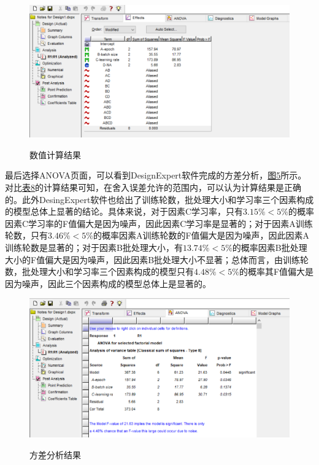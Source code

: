 \documentclass[UTF8]{ctexart}
\begin{document}
	\begin{figure}[htbp]
		\centering
		\caption{数值计算结果}
		\includegraphics[width=1.0\textwidth]{pic7.png}
		\label{Fig.4}
	\end{figure}

	最后选择ANOVA页面，可以看到DesignExpert软件完成的方差分析，\hyperref[Fig.5]{图5}所示。对比\hyperref[Chart.8]{表8}的计算结果可知，在舍入误差允许的范围内，可以认为计算结果是正确的。此外DesingExpert软件也给出了训练轮数，批处理大小和学习率三个因素构成的模型总体上显著的结论。具体来说，对于因素C学习率，只有$3.15\% < 5\%$的概率因素C学习率的F值偏大是因为噪声，因此因素C学习率是显著的；对于因素A训练轮数，只有$3.46\% < 5\%$的概率因素A训练轮数的F值偏大是因为噪声，因此因素A训练轮数是显著的；对于因素B批处理大小，有$13.74\% < 5\%$的概率因素B批处理大小的F值偏大是因为噪声，因此因素B批处理大小不显著；总体而言，由训练轮数，批处理大小和学习率三个因素构成的模型只有$4.48\% < 5\%$的概率其F值偏大是因为噪声，因此三个因素构成的模型总体上是显著的。
	
	\begin{figure}[htbp]
		\centering
		\caption{方差分析结果}
		\includegraphics[width=1.0\textwidth]{pic8.png}
		\label{Fig.5}
	\end{figure}
	
\end{document}

